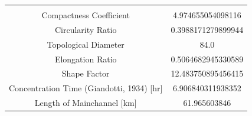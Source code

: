 \documentclass[11pt,]{article}
\begin{document}
\begin{longtable}[]{@{}cc@{}}
\begin{minipage}[t]{0.29\columnwidth}
\end{minipage}\tabularnewline
\begin{minipage}[t]{0.65\columnwidth}\centering\strut
Compactness Coefficient\strut
\end{minipage} & \begin{minipage}[t]{0.29\columnwidth}\centering\strut
4.974655054098116\strut
\end{minipage}\tabularnewline
\begin{minipage}[t]{0.65\columnwidth}\centering\strut
Circularity Ratio\strut
\end{minipage} & \begin{minipage}[t]{0.29\columnwidth}\centering\strut
0.3988171279899944\strut
\end{minipage}\tabularnewline
\begin{minipage}[t]{0.65\columnwidth}\centering\strut
Topological Diameter\strut
\end{minipage} & \begin{minipage}[t]{0.29\columnwidth}\centering\strut
84.0\strut
\end{minipage}\tabularnewline
\begin{minipage}[t]{0.65\columnwidth}\centering\strut
Elongation Ratio\strut
\end{minipage} & \begin{minipage}[t]{0.29\columnwidth}\centering\strut
0.5064682945330589\strut
\end{minipage}\tabularnewline
\begin{minipage}[t]{0.65\columnwidth}\centering\strut
Shape Factor\strut
\end{minipage} & \begin{minipage}[t]{0.29\columnwidth}\centering\strut
12.483750895456415\strut
\end{minipage}\tabularnewline
\begin{minipage}[t]{0.65\columnwidth}\centering\strut
Concentration Time (Giandotti, 1934) {[}hr{]}\strut
\end{minipage} & \begin{minipage}[t]{0.29\columnwidth}\centering\strut
6.906840311938352\strut
\end{minipage}\tabularnewline
\begin{minipage}[t]{0.65\columnwidth}\centering\strut
Length of Mainchannel {[}km{]}\strut
\end{minipage} & \begin{minipage}[t]{0.29\columnwidth}\centering\strut
61.965603846\strut
\end{minipage}\tabularnewline

\end{longtable}
\end{document}
